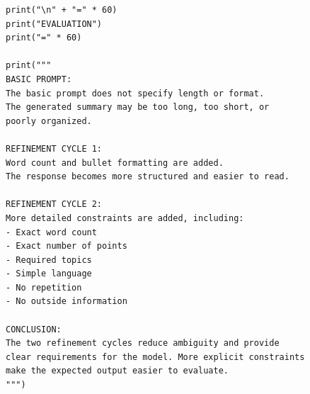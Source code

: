 \documentclass[10pt,a4paper]{article}
\begin{document}
\begin{lstlisting}[style=code]
print("\n" + "=" * 60)
print("EVALUATION")
print("=" * 60)

print("""
BASIC PROMPT:
The basic prompt does not specify length or format.
The generated summary may be too long, too short, or
poorly organized.

REFINEMENT CYCLE 1:
Word count and bullet formatting are added.
The response becomes more structured and easier to read.

REFINEMENT CYCLE 2:
More detailed constraints are added, including:
- Exact word count
- Exact number of points
- Required topics
- Simple language
- No repetition
- No outside information

CONCLUSION:
The two refinement cycles reduce ambiguity and provide
clear requirements for the model. More explicit constraints
make the expected output easier to evaluate.
""")
\end{lstlisting}
\end{document}
